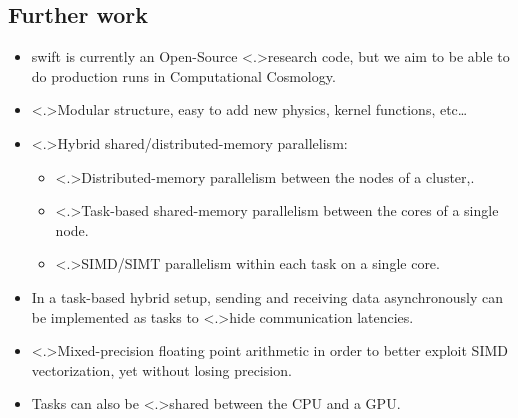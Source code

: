 \documentclass{beamer}
\begin{document}
    
    \subsection{Further work}
    
    \begin{frame}
        \begin{itemize}
        
            \pause
            
            \item<+-> {\sc swift} is currently an Open-Source \alert<.>{research
                code}, but we aim to be able to do \alert<+>{production runs}
                in Computational Cosmology.
                
            \item<+-> \alert<.>{Modular structure}, easy to add
                new physics, kernel functions, etc\dots
        
            \item<+-> \alert<.>{Hybrid} shared/distributed-memory parallelism:
            
                \begin{itemize}
                    \item<+-> \alert<.>{Distributed-memory parallelism} between the
                        nodes of a cluster,.
                    \item<+-> \alert<.>{Task-based shared-memory parallelism} between
                        the cores of a single node.
                    \item<+-> \alert<.>{SIMD/SIMT parallelism} within each task
                        on a single core.
                \end{itemize}
                
            \item<+-> In a task-based hybrid setup, sending and receiving
                data asynchronously can be implemented as tasks to
                \alert<.>{hide communication latencies}.
                
            \item<+-> \alert<.>{Mixed-precision floating point arithmetic}
                in order to better exploit SIMD vectorization, yet
                \alert<+>{without losing precision}.
                
            \item<+-> Tasks can also be \alert<.>{shared between the
                CPU and a GPU}.
                
        \end{itemize}
    \end{frame}
    
\end{document}
